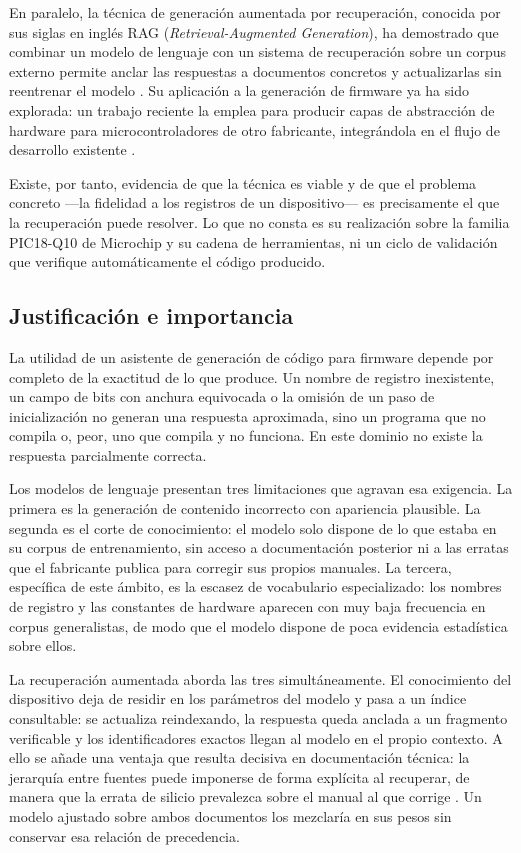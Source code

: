 En paralelo, la técnica de generación aumentada por recuperación, conocida por
sus siglas en inglés RAG (\emph{Retrieval-Augmented Generation}), ha demostrado
que combinar un modelo de lenguaje con un sistema de recuperación sobre un
corpus externo permite anclar las respuestas a documentos concretos y
actualizarlas sin reentrenar el modelo \cite{lewis2020rag}. Su aplicación a la
generación de firmware ya ha sido explorada: un trabajo reciente la emplea para
producir capas de abstracción de hardware para microcontroladores de otro
fabricante, integrándola en el flujo de desarrollo existente
\cite{haug2025microcontrollers}.

Existe, por tanto, evidencia de que la técnica es viable y de que el problema
concreto —la fidelidad a los registros de un dispositivo— es precisamente el que
la recuperación puede resolver. Lo que no consta es su realización sobre la
familia PIC18-Q10 de Microchip y su cadena de herramientas, ni un ciclo de
validación que verifique automáticamente el código producido.

\subsection*{Justificación e importancia}

La utilidad de un asistente de generación de código para firmware depende por
completo de la exactitud de lo que produce. Un nombre de registro inexistente,
un campo de bits con anchura equivocada o la omisión de un paso de
inicialización no generan una respuesta aproximada, sino un programa que no
compila o, peor, uno que compila y no funciona. En este dominio no existe la
respuesta parcialmente correcta.

Los modelos de lenguaje presentan tres limitaciones que agravan esa exigencia.
La primera es la generación de contenido incorrecto con apariencia plausible. La
segunda es el corte de conocimiento: el modelo solo dispone de lo que estaba en
su corpus de entrenamiento, sin acceso a documentación posterior ni a las
erratas que el fabricante publica para corregir sus propios manuales. La
tercera, específica de este ámbito, es la escasez de vocabulario especializado:
los nombres de registro y las constantes de hardware aparecen con muy baja
frecuencia en corpus generalistas, de modo que el modelo dispone de poca
evidencia estadística sobre ellos.

La recuperación aumentada aborda las tres simultáneamente. El conocimiento del
dispositivo deja de residir en los parámetros del modelo y pasa a un índice
consultable: se actualiza reindexando, la respuesta queda anclada a un fragmento
verificable y los identificadores exactos llegan al modelo en el propio
contexto. A ello se añade una ventaja que resulta decisiva en documentación
técnica: la jerarquía entre fuentes puede imponerse de forma explícita al
recuperar, de manera que la errata de silicio prevalezca sobre el manual al que
corrige \cite{microchip2024errata}. Un modelo ajustado sobre ambos documentos
los mezclaría en sus pesos sin conservar esa relación de precedencia.

